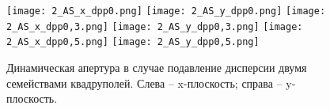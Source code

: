 \begin{figure} [h!]
   \center
   \texttt{[image: 2\_AS\_x\_dpp0.png]}
   \texttt{[image: 2\_AS\_y\_dpp0.png]}
   \texttt{[image: 2\_AS\_x\_dpp0,3.png]}
   \texttt{[image: 2\_AS\_y\_dpp0,3.png]}
   \texttt{[image: 2\_AS\_x\_dpp0,5.png]}
   \texttt{[image: 2\_AS\_y\_dpp0,5.png]}
   \caption{Динамическая апертура в случае подавление дисперсии двумя семействами квадруполей.
Слева – x-плоскость; справа – y-плоскость.}
   \label{fig:DA_AS_dpp}
\end{figure}	

\FloatBarrier
